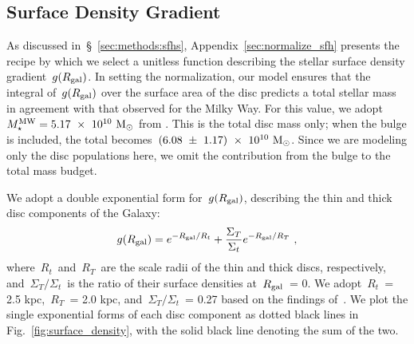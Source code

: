 \documentclass[draft2.tex]{subfiles}
\begin{document}
\subsection{Surface Density Gradient} 
\label{sec:methods:surface_density_gradient} 

As discussed in~\S~\ref{sec:methods:sfhs}, Appendix~\ref{sec:normalize_sfh} 
presents the recipe by which we select a unitless function describing the 
stellar surface density gradient~$g(R_\text{gal})$. 
In setting the normalization, our model ensures that the integral of~$g(R_\text{gal})$ 
over the surface area of the disc predicts a total stellar mass in agreement 
with that observed for the Milky Way. 
For this value, we adopt~$M_\star^\text{MW} = 5.17~\times~10^{10}~\text{M}_\odot$ from 
\citet[][$\pm 1.11\times10^{10}~\msun$]{Licquia2015}. 
This is the total disc mass only; when the bulge is included, the total 
becomes~$(6.08~\pm~1.17)~\times~10^{10}~\text{M}_\odot$. 
Since we are modeling only the disc populations here, we omit the contribution 
from the bulge to the total mass budget. 
\par 
We adopt a double exponential form for~$g(R_\text{gal})$, describing the thin and 
thick disc components of the Galaxy: 
\begin{equation} 
g(R_\text{gal}) = e^{-R_\text{gal}/R_t} + \frac{\Sigma_T}{\Sigma_t} 
e^{-R_\text{gal}/R_T}~, 
\label{eq:gradient} 
\end{equation} 
where~$R_t$~and~$R_T$~are the scale radii of the thin and thick discs, 
respectively, and~$\Sigma_T/\Sigma_t$~is the ratio of their surface densities 
at~$R_\text{gal}$~= 0. 
We adopt~$R_t$~= 2.5 kpc,~$R_T$~= 2.0 kpc, and~$\Sigma_T/\Sigma_t$~= 0.27 based 
on the findings of~\citet{Bland-Hawthorn2016}. 
We plot the single exponential forms of each disc component as dotted black 
lines in Fig.~\ref{fig:surface_density}, with the solid black line denoting the 
sum of the two. 
\end{document}
